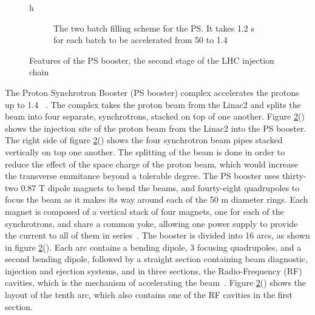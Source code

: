 \begin{figure}{h}
\begin{subfigure}[h]{0.4\textwidth}
        \caption{The two batch filling scheme for the PS.  It takes
          1.2 s for each batch to be accelerated from 50 \MeV to 1.4
          \GeV \cite{LHC:LHC_psbooster_2batchScheme_image}}\label{fig:psbooster_2batchScheme}
      \end{subfigure}
      \caption{Features of the PS booster, the second stage of
        the LHC injection chain}\label{fig:psbooster}
\end{figure}

\par The Proton Synchrotron Booster (PS booster) complex accelerates
the protons up to 1.4
\GeV~\cite{LHC:TDR_Vol3_InjectionChain_Benedikt}.  The complex takes
the proton beam from the Linac2 and splits the beam into four
separate, synchrotrons, stacked on top of one another.  Figure
\ref{fig:psbooster}() shows the
injection site of the proton beam from the Linac2 into the PS booster.
The right side of figure
\ref{fig:psbooster}() shows the four
synchrotron beam pipes stacked vertically on top one another.  The
splitting of the beam is done in order to reduce the effect of the
space charge of the proton beam, which would increase the transverse
emmitance beyond a tolerable degree.  The PS booster uses thirty-two
0.87 T dipole magnets to bend the beams, and fourty-eight quadrupoles
to focus the beam as it makes its way around each of the 50 m diameter
rings.  Each magnet is composed of a vertical stack of four magnets,
one for each of the synchrotrons, and share a common yoke, allowing one
power supply to provide the current to all of them in 
series~\cite{LHC:LHC_psbooster_boosterTurns40}.  The booster is
divided into 16 arcs, as shown in figure
\ref{fig:psbooster}().  Each arc contains
a bending dipole, 3 focusing quadrupoles, and a second bending dipole,
followed by a straight section containing beam diagnostic, injection
and ejection systems, and in three sections, the Radio-Frequency (RF) cavities, which is
the mechanism of accelerating the
beam~\cite{LHC:LHC_psbooster_layout}.  Figure
\ref{fig:psbooster}() shows the layout
of the tenth arc, which also contains one of the RF cavities in the first
section.
  

